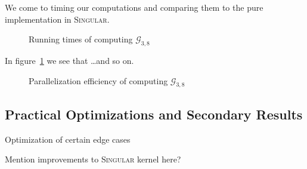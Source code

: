 \documentclass[
  paper=a4,
  titlepage,
  bibliography=totoc,
  listof=totoc,
  pagesize=pdftex
]{scrartcl}
\numberwithin{figure}{section}
\numberwithin{equation}{section}
\numberwithin{table}{section}
\theoremstyle{definition}
\numberwithin{definition}{section}
\begin{document}
We come to timing our computations and comparing them to the pure implementation in
\textsc{Singular}.

\begin{figure}[htbp]
  \begin{center}
    
  \end{center}
  \caption{Running times of computing $\mathcal{G}_{3,8}$}
  \label{fig:g38scaling}
\end{figure}

In figure~\ref{fig:g38scaling} we see that \dots and so on.

\begin{figure}[htb]
  \begin{center}
    
  \end{center}
  \caption{Parallelization efficiency of computing $\mathcal{G}_{3,8}$}
  \label{fig:g38efficiency}
\end{figure}

\subsection{Practical Optimizations and Secondary Results}

Optimization of certain edge cases

Mention improvements to \textsc{Singular} kernel here?

\newpage
\listoffigures
\newpage%
\printbibliography
\end{document}
